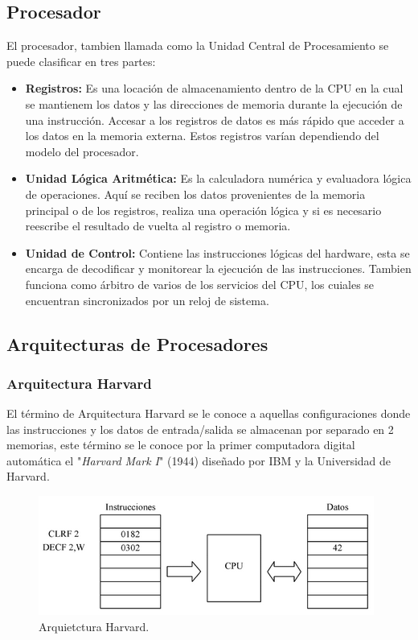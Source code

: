 \documentclass[letterpaper,12pt,oneside]{book}
\begin{document}
			\subsection{Procesador}
			El procesador, tambien llamada como la Unidad Central de Procesamiento se puede clasificar en tres partes:
		
			\begin{itemize}
				\item \textbf{Registros:} Es una locación de almacenamiento dentro de la CPU en la cual se mantienem los datos y las direcciones de memoria durante la ejecución de una instrucción. Accesar a los registros de datos es más rápido que acceder a los datos en la memoria externa. Estos registros varían dependiendo del modelo del procesador.

				\item \textbf{Unidad Lógica Aritmética:} Es la calculadora numérica y evaluadora lógica de operaciones. Aquí se reciben los datos provenientes de la memoria principal o de los registros, realiza una operación lógica y si es necesario reescribe el resultado de vuelta al registro o memoria.

				\item \textbf{Unidad de Control:} Contiene las instrucciones lógicas del hardware, esta se encarga de decodificar y monitorear la ejecución de las instrucciones. Tambien funciona como árbitro de varios de los servicios del CPU, los cuiales se encuentran sincronizados por un reloj de sistema.
			\end{itemize}

			\subsection{Arquitecturas de Procesadores}

				\subsubsection{Arquitectura Harvard}
				El término de Arquitectura Harvard se le conoce a aquellas configuraciones donde las instrucciones y los datos de entrada/salida se almacenan por separado en 2 memorias, este término se le conoce por la primer computadora digital automática el "\textit{Harvard Mark I}" (1944) diseñado por IBM y la Universidad de Harvard\cite{cuellar2008sistemas}.

				\begin{figure}[!htpb]
					\centering
					\includegraphics[scale = 1.0]{Material de Consulta/ArqHrv.PNG}
					\caption[Arquietctura Harvard]{Arquietctura Harvard.}
					\label{ArqHrv}
				\end{figure}
\end{document}
